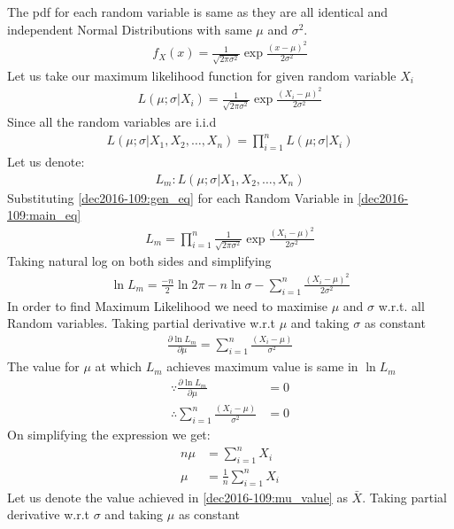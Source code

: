 The pdf for each random variable is same as they are all identical and independent Normal Distributions with same $\mu$ and $\sigma^2$.
\begin{align}
    f_X(x) = \frac{1}{\sqrt{2\pi\sigma^2}}\exp{\frac{(x-\mu)^2}{2\sigma^2}}
\end{align}
Let us take our maximum likelihood function for given random variable $X_i$
\begin{align}
    L(\mu ; \sigma | X_i) = \frac{1}{\sqrt{2\pi\sigma^2}}\exp{\frac{(X_i-\mu)^2}{2\sigma^2}}\label{dec2016-109:gen_eq}
\end{align}
Since all the random variables are i.i.d
\begin{align}
    L(\mu ; \sigma | X_1,X_2,\ldots,X_n) = \prod_{i=1}^nL(\mu ; \sigma | X_i)\label{dec2016-109:main_eq}
\end{align}
Let us denote:
\begin{align}
    L_m : L(\mu ; \sigma | X_1,X_2,\ldots,X_n)
\end{align}
Substituting \eqref{dec2016-109:gen_eq} for each Random Variable in \eqref{dec2016-109:main_eq}
\begin{align}
    L_m = \prod_{i=1}^n\frac{1}{\sqrt{2\pi\sigma^2}}\exp{\frac{(X_i-\mu)^2}{2\sigma^2}}
\end{align}
Taking natural log on both sides and simplifying
\begin{align}
    \ln{L_m} = \frac{-n}{2}\ln{2\pi} -n\ln{\sigma} - \sum_{i = 1}^n\frac{(X_i - \mu)^2}{2\sigma^2}
\end{align}
In order to find Maximum Likelihood we need to maximise $\mu$ and $\sigma$ w.r.t. all Random variables. Taking partial derivative w.r.t $\mu$ and taking $\sigma$ as constant 
\begin{align}
    \frac{\partial \ln{L_m}}{\partial \mu} = \sum_{i = 1}^n\frac{(X_i - \mu)}{\sigma^2}
\end{align}
The value for $\mu$ at which $L_m$ achieves maximum value is same in $\ln{L_m}$
\begin{align}
   \because \frac{\partial \ln{L_m}}{\partial \mu} &=0\\
   \therefore \sum_{i = 1}^n\frac{(X_i -\mu)}{\sigma^2}&=0
\end{align}
On simplifying the expression we get:
\begin{align}
    n\mu &= \sum_{i=1}^nX_i\\
    \mu &= \frac{1}{n}\sum_{i=1}^nX_i\label{dec2016-109:mu_value}
\end{align}
Let us denote the value achieved in \eqref{dec2016-109:mu_value} as $\bar{X}$. Taking partial derivative w.r.t $\sigma$ and taking $\mu$ as constant

